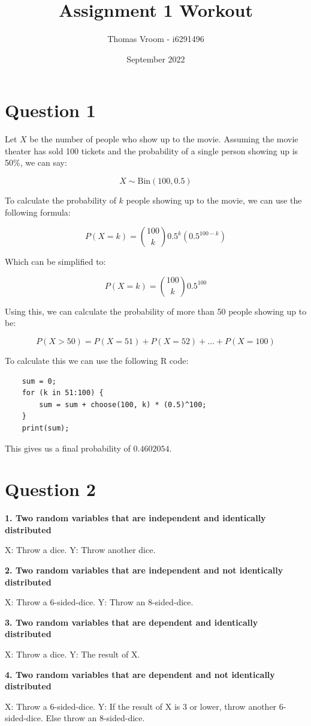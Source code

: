 \documentclass[12pt]{article}
\title{Assignment 1 Workout}
\author{Thomas Vroom - i6291496}
\date{September 2022}
\begin{document}
\maketitle
{}

\section*{Question 1}
Let $X$ be the number of people who show up to the movie.
Assuming the movie theater has sold 100 tickets and the 
probability of a single person showing up is 50\%, 
we can say:

\[ X \sim \text{Bin} (100, 0.5) \]

\smallskip
\noindent
To calculate the probability of $k$ people showing up to
the movie, we can use the following formula:

\[ P(X = k) = \binom{100}{k} {0.5}^k ({0.5}^{100-k}) \]

\smallskip
\noindent
Which can be simplified to:

\[ P(X = k) = \binom{100}{k} {0.5}^{100} \]

\smallskip
\noindent
Using this, we can calculate the probability of more than
50 people showing up to be:

\[ P(X > 50) = P(X = 51) + P(X = 52) + ... + P(X = 100) \]

\bigskip
\noindent
To calculate this we can use the following R code:

\begin{lstlisting}
    sum = 0;
    for (k in 51:100) {
        sum = sum + choose(100, k) * (0.5)^100;
    }
    print(sum);
\end{lstlisting}

\smallskip
\noindent
This gives us a final probability of $0.4602054$.

\section*{Question 2}

\textbf{1. Two random variables that are 
independent and identically distributed}

\smallskip
\noindent
X: Throw a dice.
Y: Throw another dice.

\bigskip
\noindent
\textbf{2. Two random variables that are 
independent and not identically distributed}

\smallskip
\noindent
X: Throw a 6-sided-dice.
Y: Throw an 8-sided-dice.

\bigskip
\noindent
\textbf{3. Two random variables that are 
dependent and identically distributed}

\smallskip
\noindent
X: Throw a dice.
Y: The result of X.

\bigskip
\noindent
\textbf{4. Two random variables that are 
dependent and not identically distributed}

\smallskip
\noindent
X: Throw a 6-sided-dice.
Y: If the result of X is 3 or lower, throw another
6-sided-dice. Else throw an 8-sided-dice.
\end{document}
